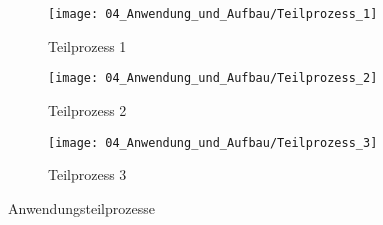 	 \begin{figure}[h!]
	 	\centering
	 	\begin{subfigure}[b]{0.28\textwidth}
	 		\centering
	 		\texttt{[image: 04\_Anwendung\_und\_Aufbau/Teilprozess\_1]}
	 		\caption{Teilprozess 1}
	 		\label{fig:Teilprozess 1}
	 	\end{subfigure}
	 	\hfill
	 	\begin{subfigure}[b]{0.28\textwidth}
	 		\centering
	 		\texttt{[image: 04\_Anwendung\_und\_Aufbau/Teilprozess\_2]}
	 		\caption{Teilprozess 2}
	 		\label{fig:Teilprozess 2}
	 	\end{subfigure}
	 	\hfill
	 	\begin{subfigure}[b]{0.32\textwidth}
	 		\centering
	 		\texttt{[image: 04\_Anwendung\_und\_Aufbau/Teilprozess\_3]}
	 		\caption{Teilprozess 3}
	 		\label{fig:Teilprozess 3}
	 	\end{subfigure}
	 	\caption{Anwendungsteilprozesse}
	 	\label{fig:Teilprozesse}
	 \end{figure}
	 
	
	 \newpage
	 